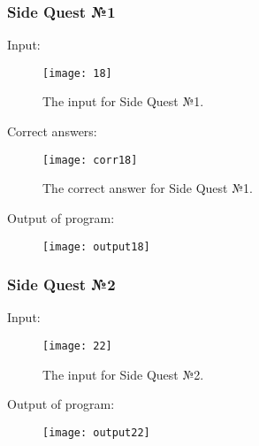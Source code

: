 \documentclass[12pt]{article}
\begin{document}
	\subsubsection{\LARGE Side Quest №1}
	Input:
	\begin{figure}[H]
		\texttt{[image: 18]}
		\caption{The input for Side Quest №1.}
		\label{fig:18}
	\end{figure}
	Correct answers:
	\begin{figure}[H]
		\texttt{[image: corr18]}
		\caption{The correct answer for Side Quest №1.}
		\label{fig:corr18}
	\end{figure}
	Output of program:
	\begin{figure}[H]
		\texttt{[image: output18]}
		\label{fig:out18}
	\end{figure}
	\subsubsection{\LARGE Side Quest №2}
	Input:
	\begin{figure}[H]
		\texttt{[image: 22]}
		\caption{The input for Side Quest №2.}
		\label{fig:22}
	\end{figure}
	Output of program:
	\begin{figure}[H]
		\texttt{[image: output22]}
		\label{fig:out22}
	\end{figure}
\end{document}
